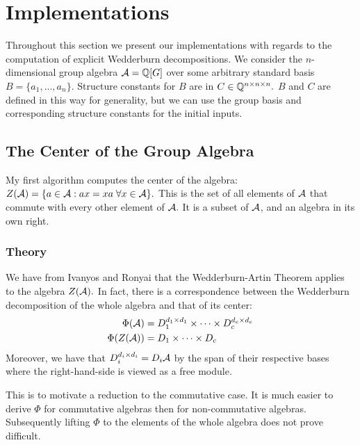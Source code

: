 \documentclass[../thesis.tex]{subfiles}
\begin{document}
\section{Implementations}\label{sec:Implementations}
Throughout this section we present our implementations with regards to the computation of explicit Wedderburn decompositions. We consider the $n$-dimensional group algebra $\mathcal{A} = \mathbb{Q}[G]$ over some arbitrary standard basis $B = \{a_1,...,a_n\}.$ Structure constants for $B$ are in $C\in\mathbb{Q}^{n\times n\times n}.$ $B$ and $C$ are defined in this way for generality, but we can use the group basis and corresponding structure constants for the initial inputs.

\subsection{The Center of the Group Algebra}\label{sec:algebracenter}
My first algorithm computes the center of the algebra: $Z(\mathcal{A}) = \{a\in\mathcal{A}: ax = xa\; \forall x\in\mathcal{A}\}.$ This is the set of all elements of $\mathcal{A}$ that commute with every other element of $\mathcal{A}.$ It is a subset of $\mathcal{A}$, and an algebra in its own right. 

\subsubsection{Theory}
We have from Ivanyos and Ronyai \cite{tapas} that the Wedderburn-Artin Theorem applies to the algebra $Z(\mathcal{A}).$ In fact, there is a correspondence between the Wedderburn decomposition of the whole algebra and that of its center:
\begin{align}
    \Phi(\mathcal{A}) &= D_1^{d_1\times d_1}\times \cdots \times D_c^{d_c\times d_c}\nonumber\\
    \Phi(Z(\mathcal{A})) &= D_1\times\cdots\times D_c\label{eq:WAcommutative}
\end{align}
Moreover, we have that $D_i^{d_i\times d_i} = D_i\mathcal{A}$ by the span of their respective bases where the right-hand-side is viewed as a free module. 

This is to motivate a reduction to the commutative case. It is much easier to derive $\Phi$ for commutative algebras then for non-commutative algebras. Subsequently lifting $\Phi$ to the elements of the whole algebra does not prove difficult.
\end{document}

